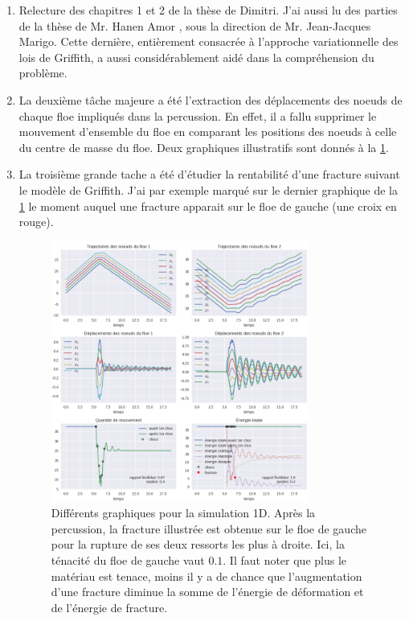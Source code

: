 \documentclass[
  french,
	11pt, %
]{fphw}
\begin{document}
\begin{enumerate}
  \item Relecture des chapitres 1 et 2 de la thèse de Dimitri. J'ai aussi lu des parties de la thèse de Mr. Hanen Amor \parencite{amor2008approche}, sous la direction de Mr. Jean-Jacques Marigo. Cette dernière, entièrement consacrée à l'approche variationnelle des lois de Griffith, a aussi considérablement aidé dans la compréhension du problème. 
  \item La deuxième tâche majeure a été l'extraction des déplacements des noeuds de chaque floe impliqués dans la percussion. En effet, il a fallu supprimer le mouvement d'ensemble du floe en comparant les positions des noeuds à celle du centre de masse du floe. Deux graphiques illustratifs sont donnés à la \cref{fig:myfig2}.
  \item La troisième grande tache a été d'étudier la rentabilité d'une fracture suivant le modèle de Griffith. J'ai par exemple marqué sur le dernier graphique de la \cref{fig:myfig2} le moment auquel une fracture apparait sur le floe de gauche (une croix en rouge).  
  \begin{figure}[h]
    \centering
    \includegraphics[width=0.80\textwidth]{fracture.png}
    \caption{Différents graphiques pour la simulation 1D. Après la percussion, la fracture illustrée est obtenue sur le floe de gauche pour la rupture de ses deux ressorts les plus à droite. Ici, la ténacité du floe de gauche vaut $0.1$. Il faut noter que plus le matériau est tenace, moins il y a de chance que l'augmentation d'une fracture diminue la somme de l'énergie de déformation et de l'énergie de fracture.}
    \label{fig:myfig2}
  \end{figure}
\end{enumerate}
\end{document}
